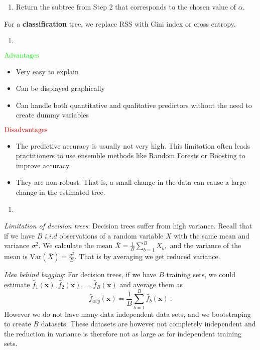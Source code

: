 \documentclass[
]{article}
\providecommand{\tightlist}{%
  \setlength{\itemsep}{0pt}\setlength{\parskip}{0pt}}
\begin{document}
\begin{enumerate}
\def\labelenumi{\arabic{enumi}.}
\setcounter{enumi}{3}
\tightlist
\item
  Return the subtree from Step 2 that corresponds to the chosen value of
  \(\alpha.\)
\end{enumerate}

For a \textbf{classification} tree, we replace RSS with Gini index or
cross entropy.

\begin{enumerate}
\def\labelenumi{\alph{enumi})}
\setcounter{enumi}{1}
\tightlist
\item
\end{enumerate}

\(\color{green}{\text{Advantages}}\)

\begin{itemize}
\item
  Very easy to explain
\item
  Can be displayed graphically
\item
  Can handle both quantitative and qualitative predictors without the
  need to create dummy variables
\end{itemize}

\(\color{red}{\text{Disadvantages}}\)

\begin{itemize}
\item
  The predictive accuracy is usually not very high. This limitation
  often leads practitioners to use ensemble methods like Random Forests
  or Boosting to improve accuracy.
\item
  They are non-robust. That is, a small change in the data can cause a
  large change in the estimated tree.
\end{itemize}

\begin{enumerate}
\def\labelenumi{\alph{enumi})}
\setcounter{enumi}{2}
\tightlist
\item
\end{enumerate}

\emph{Limitation of decision trees}: Decision trees suffer from high
variance. Recall that if we have \(B\) \(i.i.d\) observations of a
random variable \(X\) with the same mean and variance \(\sigma^2.\) We
calculate the mean \(\bar{X} = \frac{1}{B} \sum_{b=1}^B X_b,\) and the
variance of the mean is \(\text{Var}(\bar{X}) = \frac{\sigma^2}{B}.\)
That is by averaging we get reduced variance.

\emph{Idea behind bagging}: For decision trees, if we have \(B\)
training sets, we could estimate
\(\hat{f}_1({\boldsymbol x}),\hat{f}_2({\boldsymbol x}),\ldots, \hat{f}_B({\boldsymbol x})\)
and average them as \[
\hat{f}_{avg}({\boldsymbol x})=\frac{1}{B}\sum_{b=1}^B \hat{f}_b({\boldsymbol x}) \ .
\] However we do not have many data independent data sets, and we
bootstraping to create \(B\) datasets. These datasets are however not
completely independent and the reduction in variance is therefore not as
large as for independent training sets.
\end{document}
